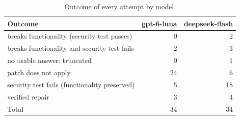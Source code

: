 \begin{table}[ht]
\centering
\caption{Outcome of every attempt by model.}
\label{tab:final-outcomes}
\begin{tabular}{lrr}
\hline
Outcome & gpt-6-luna & deepseek-flash \\
\hline
breaks functionality (security test passes) & 0 & 2 \\
breaks functionality and security test fails & 2 & 3 \\
no usable answer: truncated & 0 & 1 \\
patch does not apply & 24 & 6 \\
security test fails (functionality preserved) & 5 & 18 \\
verified repair & 3 & 4 \\
Total & 34 & 34 \\
\hline
\end{tabular}
\end{table}
